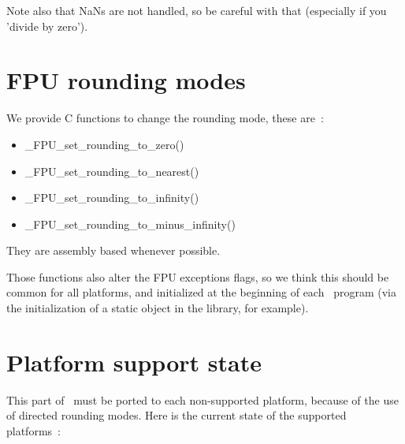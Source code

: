\smallskip

Note also that NaNs are not handled, so be careful with that
(especially if you 'divide by zero').


\section{FPU rounding modes}

We provide C functions to change the rounding mode, these are~:
\begin{itemize}
\item \_FPU\_set\_rounding\_to\_zero()
\item \_FPU\_set\_rounding\_to\_nearest()
\item \_FPU\_set\_rounding\_to\_infinity()
\item \_FPU\_set\_rounding\_to\_minus\_infinity()
\end{itemize}

They are assembly based whenever possible.

Those functions also alter the FPU exceptions flags, so we think this should
be common for all platforms, and initialized at the beginning of each \cgal\
program (via the initialization of a static object in the library, for example).

\section{Platform support state}

This part of \cgal\ must be ported to each non-supported platform, because of
the use of directed rounding modes.  Here is the current state of the
supported platforms~:

